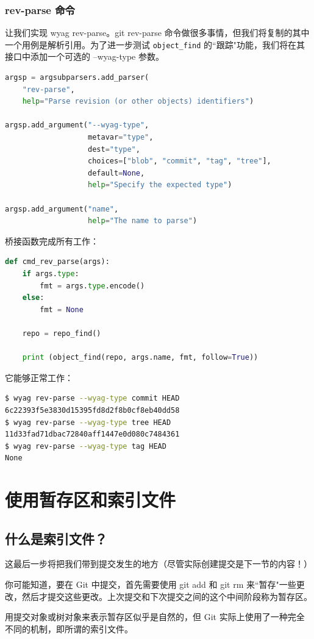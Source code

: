 \documentclass{ctexart}
\theoremstyle{remark}
\theoremstyle{warningstyle}
\theoremstyle{warningstyle}
\begin{document}
\subsubsection{rev-parse 命令}
让我们实现 wyag rev-parse。git rev-parse 命令做很多事情，但我们将复制的其中一个用例是解析引用。为了进一步测试 \lstinline|object_find| 的``跟踪"功能，我们将在其接口中添加一个可选的 --wyag-type 参数。
\begin{lstlisting}[language=Python]
argsp = argsubparsers.add_parser(
    "rev-parse",
    help="Parse revision (or other objects) identifiers")

argsp.add_argument("--wyag-type",
                   metavar="type",
                   dest="type",
                   choices=["blob", "commit", "tag", "tree"],
                   default=None,
                   help="Specify the expected type")

argsp.add_argument("name",
                   help="The name to parse")
\end{lstlisting}
桥接函数完成所有工作：
\begin{lstlisting}[language=Python]
def cmd_rev_parse(args):
    if args.type:
        fmt = args.type.encode()
    else:
        fmt = None

    repo = repo_find()

    print (object_find(repo, args.name, fmt, follow=True))
\end{lstlisting}
它能够正常工作：
\begin{lstlisting}[language=bash]
$ wyag rev-parse --wyag-type commit HEAD
6c22393f5e3830d15395fd8d2f8b0cf8eb40dd58
$ wyag rev-parse --wyag-type tree HEAD
11d33fad71dbac72840aff1447e0d080c7484361
$ wyag rev-parse --wyag-type tag HEAD
None
\end{lstlisting}

\section{使用暂存区和索引文件}
\subsection{什么是索引文件？}
这最后一步将把我们带到提交发生的地方（尽管实际创建提交是下一节的内容！）

你可能知道，要在 Git 中提交，首先需要使用 git add 和 git rm 来``暂存"一些更改，然后才提交这些更改。上次提交和下次提交之间的这个中间阶段称为暂存区。

用提交对象或树对象来表示暂存区似乎是自然的，但 Git 实际上使用了一种完全不同的机制，即所谓的索引文件。
\end{document}
